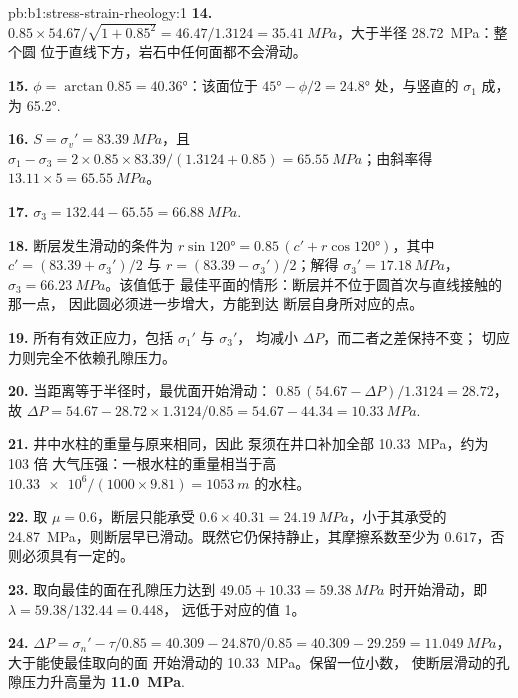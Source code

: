 \begin{solution}{pb:b1:stress-strain-rheology:1}
\textbf{14.} $0.85\times54.67/\sqrt{1 + 0.85^2} = 46.47/1.3124 =
\qty{35.41}{MPa}$，大于半径 \qty{28.72}{MPa}：整个圆
位于直线下方，岩石中任何面都不会滑动。

\textbf{15.} $\phi = \arctan0.85 = \ang{40.36}$：该面位于
$\ang{45} - \phi/2 = \ang{24.8}$ 处，与竖直的 $\sigma_1$ 成，为
\ang{65.2}.

\textbf{16.} $S = \sigma_v' = \qty{83.39}{MPa}$，且
$\sigma_1 - \sigma_3 = 2\times0.85\times83.39/(1.3124 + 0.85) =
\qty{65.55}{MPa}$；由斜率得 $13.11\times5 = \qty{65.55}{MPa}$。

\textbf{17.} $\sigma_3 = 132.44 - 65.55 = \qty{66.88}{MPa}$.

\textbf{18.} 断层发生滑动的条件为
$r\sin\ang{120} = 0.85\,(c' + r\cos\ang{120})$，其中
$c' = (83.39 + \sigma_3')/2$ 与 $r = (83.39 - \sigma_3')/2$；解得
$\sigma_3' = \qty{17.18}{MPa}$，$\sigma_3 = \qty{66.23}{MPa}$。该值低于
最佳平面的情形：断层并不位于圆首次与直线接触的那一点，
因此圆必须进一步增大，方能到达
断层自身所对应的点。

\textbf{19.} 所有有效正应力，包括 $\sigma_1'$ 与 $\sigma_3'$，
均减小 $\Delta P$，而二者之差保持不变；
切应力则完全不依赖孔隙压力。

\textbf{20.} 当距离等于半径时，最优面开始滑动：
$0.85\,(54.67 - \Delta P)/1.3124 = 28.72$，故
$\Delta P = 54.67 - 28.72\times1.3124/0.85 = 54.67 - 44.34 = \qty{10.33}{MPa}$.

\textbf{21.} 井中水柱的重量与原来相同，因此
泵须在井口补加全部 \qty{10.33}{MPa}，约为 103 倍
大气压强：一根水柱的重量相当于高
$\num{10.33e6}/(1000\times9.81) = \qty{1053}{m}$ 的水柱。

\textbf{22.} 取 $\mu = 0.6$，断层只能承受
$0.6\times40.31 = \qty{24.19}{MPa}$，小于其承受的
\qty{24.87}{MPa}，则断层早已滑动。既然它仍保持静止，其摩擦系数至少为
$0.617$，否则必须具有一定的。

\textbf{23.} 取向最佳的面在孔隙压力达到
$49.05 + 10.33 = \qty{59.38}{MPa}$ 时开始滑动，即 $\lambda = 59.38/132.44 = 0.448$，
远低于对应的值 1。

\textbf{24.} $\Delta P = \sigma_n' - \tau/0.85 = 40.309 - 24.870/0.85 = 40.309 -
29.259 = \qty{11.049}{MPa}$，大于能使最佳取向的面
开始滑动的 \qty{10.33}{MPa}。保留一位小数，
使断层滑动的孔隙压力升高量为
\textbf{\qty[text-series-to-math=true]{11.0}{MPa}}.
\end{solution}
